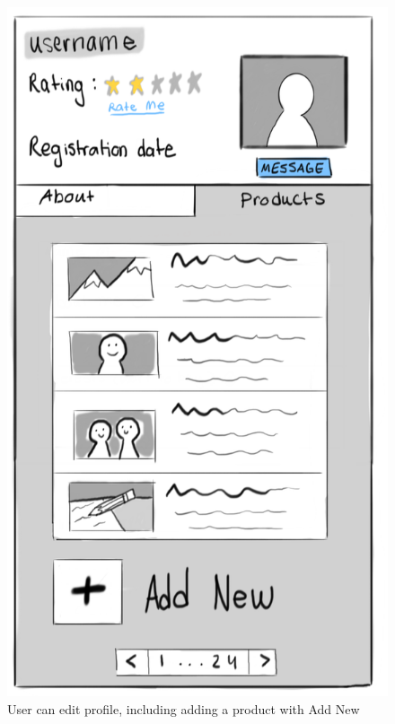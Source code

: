 \documentclass[]{article}
\begin{document}
\begin{enumerate}
			\begin{figure}
			  \includegraphics[width=\linewidth]{./pictures/profile_product.png}
			  \caption{User can edit profile, including adding a product with Add New}
			  \label{fig:seller3}
			\end{figure}
			

\end{enumerate}
\end{document}
